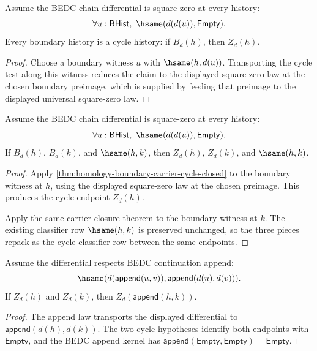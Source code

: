 \begin{theorem}
\label{thm:homology-boundary-carrier-cycle-closed}
Assume the BEDC chain differential is square-zero at every history:
$$
\forall u:\mathsf{BHist},\ \hsame(d(d(u)),\mathsf{Empty}).
$$
Every boundary history is a cycle history: if $B_d(h)$, then $Z_d(h)$.
\end{theorem}
\begin{proof}
Choose a boundary witness $u$ with $\hsame(h,d(u))$. Transporting the cycle
test along this witness reduces the claim to the displayed square-zero law at
the chosen boundary preimage, which is supplied by feeding that preimage to the
displayed universal square-zero law.
\end{proof}

\begin{theorem}
\label{thm:homology-boundary-classifier-refines-cycle-classifier}
Assume the BEDC chain differential is square-zero at every history:
$$
\forall u:\mathsf{BHist},\ \hsame(d(d(u)),\mathsf{Empty}).
$$
If $B_d(h)$, $B_d(k)$, and $\hsame(h,k)$, then $Z_d(h)$, $Z_d(k)$, and
$\hsame(h,k)$.
\end{theorem}
\begin{proof}
Apply \autoref{thm:homology-boundary-carrier-cycle-closed} to the boundary
witness at $h$, using the displayed square-zero law at the chosen preimage.
This produces the cycle endpoint $Z_d(h)$.

Apply the same carrier-closure theorem to the boundary witness at $k$. The
existing classifier row $\hsame(h,k)$ is preserved unchanged, so the three
pieces repack as the cycle classifier row between the same endpoints.
\end{proof}

\begin{theorem}
\label{thm:homology-cycle-carrier-append-closed}
Assume the differential respects BEDC continuation append:
$$
\hsame(d(\mathsf{append}(u,v)),\mathsf{append}(d(u),d(v))).
$$
If $Z_d(h)$ and $Z_d(k)$, then
$Z_d(\mathsf{append}(h,k))$.
\end{theorem}
\begin{proof}
The append law transports the displayed differential to
$\mathsf{append}(d(h),d(k))$. The two cycle hypotheses identify both
endpoints with $\mathsf{Empty}$, and the BEDC append kernel has
$\mathsf{append}(\mathsf{Empty},\mathsf{Empty})=\mathsf{Empty}$.
\end{proof}

